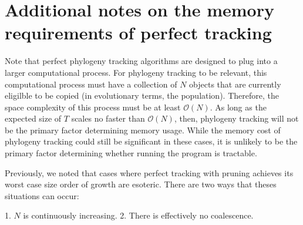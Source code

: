 \section{Additional notes on the memory requirements of perfect tracking} \label{sec:perfect-tracking-space-supp}

Note that perfect phylogeny tracking algorithms are designed to plug into a larger computational process.
For phylogeny tracking to be relevant, this computational process must have a collection of $N$ objects that are currently eligilble to be copied (in evolutionary terms, the population).
Therefore, the space complexity of this process must be at least $\mathcal{O}(N)$.
As long as the expected size of $T$ scales no faster than $\mathcal{O}(N)$, then, phylogeny tracking will not be the primary factor determining memory usage.
While the memory cost of phylogeny tracking could still be significant in these cases, it is unlikely to be the primary factor determining whether running the program is tractable.

Previously, we noted that cases where perfect tracking with pruning achieves its worst case size order of growth are esoteric.
There are two ways that theses situations can occur:

1. $N$ is continuously increasing.
2. There is effectively no coalescence.

